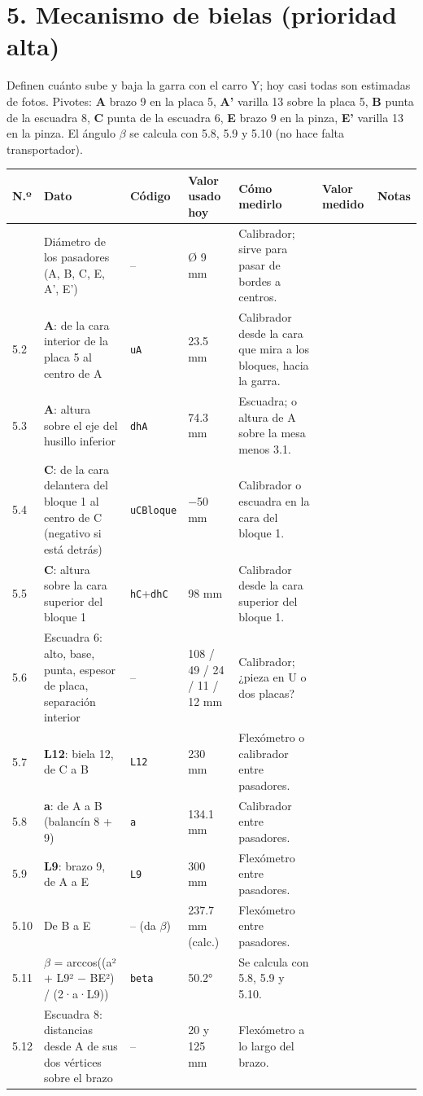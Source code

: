 \documentclass[10pt]{article}
\makeatletter
\newenvironment{medidas}{%
  \small
  \begin{longtable}{@{}L{0.9cm}L{5.0cm}L{2.3cm}L{2.7cm}L{6.4cm}>{\columncolor{fondo}}L{3.1cm}L{2.4cm}@{}}
  \toprule
  \textbf{N.º} & \textbf{Dato} & \textbf{Código} & \textbf{Valor usado hoy} & \textbf{Cómo medirlo} & \textbf{Valor medido} & \textbf{Notas}\\
  \midrule\endhead
  \bottomrule\endfoot}{\end{longtable}}
\newcommand{\cod}[1]{\texttt{\footnotesize #1}}
\makeatother
\begin{document}
\section{5. Mecanismo de bielas (prioridad alta)}
Definen cuánto sube y baja la garra con el carro Y; hoy casi todas son estimadas de fotos. Pivotes: \textbf{A} brazo 9 en la placa 5, \textbf{A'} varilla 13
sobre la placa 5, \textbf{B} punta de la escuadra 8, \textbf{C} punta de la escuadra 6, \textbf{E} brazo 9 en la pinza, \textbf{E'} varilla 13 en la pinza.
El ángulo $\beta$ se calcula con 5.8, 5.9 y 5.10 (no hace falta transportador).
\begin{medidas}
5.1 & Diámetro de los pasadores (A, B, C, E, A', E') & -- & Ø 9 mm & Calibrador; sirve para pasar de bordes a centros. & & \\
5.2 & \textbf{A}: de la cara interior de la placa 5 al centro de A & \cod{uA} & 23.5 mm & Calibrador desde la cara que mira a los bloques, hacia la garra. & & \\
5.3 & \textbf{A}: altura sobre el eje del husillo inferior & \cod{dhA} & 74.3 mm & Escuadra; o altura de A sobre la mesa menos 3.1. & & \\
5.4 & \textbf{C}: de la cara delantera del bloque 1 al centro de C (negativo si está detrás) & \cod{uCBloque} & $-$50 mm & Calibrador o escuadra en la cara del bloque 1. & & \\
5.5 & \textbf{C}: altura sobre la cara superior del bloque 1 & \cod{hC}+\cod{dhC} & 98 mm & Calibrador desde la cara superior del bloque 1. & & \\
5.6 & Escuadra 6: alto, base, punta, espesor de placa, separación interior & -- & 108 / 49 / 24 / 11 / 12 mm & Calibrador; ¿pieza en U o dos placas? & & \\
5.7 & \textbf{L12}: biela 12, de C a B & \cod{L12} & 230 mm & Flexómetro o calibrador entre pasadores. & & \\
5.8 & \textbf{a}: de A a B (balancín 8 + 9) & \cod{a} & 134.1 mm & Calibrador entre pasadores. & & \\
5.9 & \textbf{L9}: brazo 9, de A a E & \cod{L9} & 300 mm & Flexómetro entre pasadores. & & \\
5.10 & De B a E & -- (da $\beta$) & 237.7 mm (calc.) & Flexómetro entre pasadores. & & \\
5.11 & $\beta$ = arccos((a² + L9² $-$ BE²) / (2·a·L9)) & \cod{beta} & 50.2° & Se calcula con 5.8, 5.9 y 5.10. & & \\
5.12 & Escuadra 8: distancias desde A de sus dos vértices sobre el brazo & -- & 20 y 125 mm & Flexómetro a lo largo del brazo. & & \\

\end{medidas}
\end{document}
